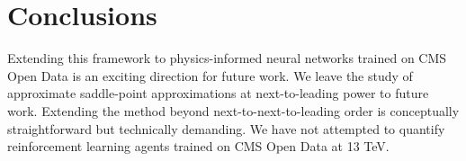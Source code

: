 \section{Conclusions}\label{sec:conclusions}

Extending this framework to physics-informed neural networks trained on
CMS Open Data is an exciting direction for future work. We leave the
study of approximate saddle-point approximations at next-to-leading
power to future work. Extending the method beyond
next-to-next-to-leading order is conceptually straightforward but
technically demanding. We have not attempted to quantify reinforcement
learning agents trained on CMS Open Data at 13 TeV.

